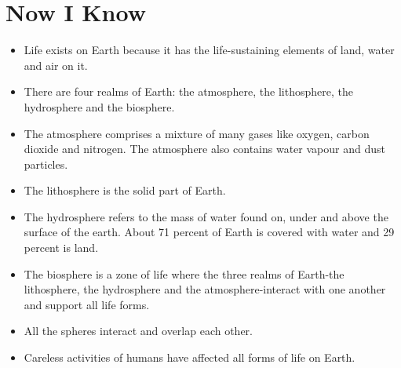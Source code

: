 \section{Now I Know}
\begin{itemize}
    \item Life exists on Earth because it has the life-sustaining elements of land, water and air on it.
    \item There are four realms of Earth: the atmosphere, the lithosphere, the hydrosphere and the biosphere.
    \item The atmosphere comprises a mixture of many gases like oxygen, carbon dioxide and nitrogen. The atmosphere also contains water vapour and dust particles.
    \item The lithosphere is the solid part of Earth.
    \item The hydrosphere refers to the mass of water found on, under and above the surface of the earth. About 71 percent of Earth is covered with water and 29 percent is land.
    \item The biosphere is a zone of life where the three realms of Earth-the lithosphere, the hydrosphere and the atmosphere-interact with one another and support all life forms.
    \item All the spheres interact and overlap each other.
    \item Careless activities of humans have affected all forms of life on Earth.
\end{itemize}